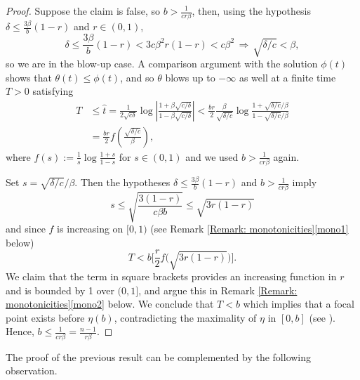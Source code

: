 \documentclass[a4paper,11pt]{article}
\numberwithin{equation}{section}
\theoremstyle{definition}
\theoremstyle{plain}
\begin{document}
\begin{proof}
Suppose the claim is false, so $b>\frac{1}{cr\beta}$, then, using the hypothesis $\delta \leq \frac{3\beta}{b}(1-r)$ and $r\in (0,1)$,
\[
\delta \le \frac{3\beta}{b} (1-r) < 3c\beta^2 r(1-r) < c\beta^2 \,\Rightarrow\, \sqrt{\delta/c} < \beta ,
\]
so we are in the blow-up case.
A comparison argument with the solution \(\phi(t)\) shows  that \(\theta(t)\leq \phi(t)\), and so \(\theta\) blows up to \(-\infty\) as well at a finite time $T>0$ satisfying
\begin{align*}
T &\le \hat t 
=\frac{1}{2\sqrt{c\delta}} \log \left\vert \frac{1+\beta\sqrt{c/\delta}}{1-\beta\sqrt{c/\delta}}\right\vert 
< \frac{b r}{2} \frac{\beta}{\sqrt{\delta/c}} \log \frac{1+\sqrt{\delta/c}/\beta}{1-\sqrt{\delta/c}/\beta}\\
&=\frac{br}{2} f\left(\frac{\sqrt{\delta/c}}{\beta}\right),
\end{align*}
where $f(s):=\frac{1}{s} \log \frac{1+s}{1-s}$ for $s \in (0,1)$ and we used $b>\frac{1}{cr\beta}$ again.

Set $s = \sqrt{\delta/c}/\beta$. 
Then the hypotheses \(\delta \leq \frac{3\beta}{b}(1-r)\) and \(b > \frac{1}{cr\beta}\) imply 
\[
s \le \sqrt{\frac{3(1-r)}{c\beta b}} \le \sqrt{3r(1-r)}
\]
and since $f$ is increasing on $[0,1)$ (see Remark \ref{Remark: monotonicities}\ref{mono1} below)
\[
T<b \biggl[\frac{r}{2} f\bigl(\sqrt{3r(1-r)}\bigr)\biggr].
\]
We claim that the term in square brackets provides an increasing function in $r$ and is bounded by 1 over $(0,1]$, and argue this in Remark \ref{Remark: monotonicities}\ref{mono2} below. 
We conclude that $T<b$ which implies that a focal point exists before $\eta(b)$, contradicting the maximality of $\eta$ in $[0,b]$ (see \cite[Prop.\ 5.1]{MinguzziRaychaudhuri}).
Hence, $b\le \frac{1}{cr\beta}= \frac{n-1}{r\beta}$.
\end{proof}

The proof of the previous result can be complemented by the following observation.
\end{document}
